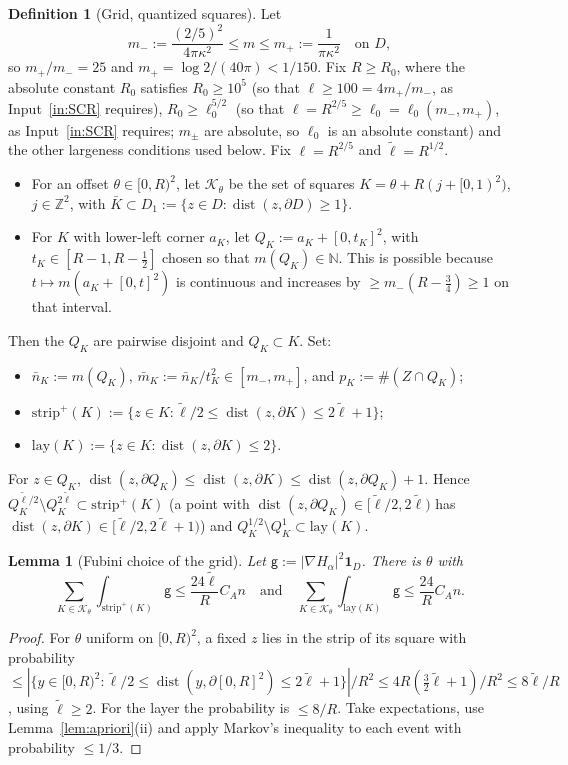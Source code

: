 \documentclass[11pt]{article}
\newtheorem{lemma}[theorem]{Lemma}
\theoremstyle{definition}
\newtheorem{definition}[theorem]{Definition}
\theoremstyle{remark}
\newcommand{\N}{\mathbb N}
\newcommand{\Z}{\mathbb Z}
\begin{document}
\begin{definition}[Grid, quantized squares]\label{def:grid}
Let
\[
m_-:=\frac{(2/5)^2}{4\pi\kappa^2}\le m\le m_+:=\frac1{\pi\kappa^2}\quad\text{on } D ,
\]
so $m_+/m_-=25$ and $m_+=\log2/(40\pi)<1/150$. Fix $R\ge R_0$, where the absolute constant $R_0$
satisfies $R_0\ge10^5$ (so that $\ell\ge100=4m_+/m_-$, as Input~\ref{in:SCR} requires),
$R_0\ge\ell_0^{5/2}$ (so that $\ell=R^{2/5}\ge\ell_0=\ell_0(m_-,m_+)$, as Input~\ref{in:SCR} requires;
$m_\pm$ are absolute, so $\ell_0$ is an absolute constant) and the other
largeness conditions used below. Fix $\ell=R^{2/5}$ and $\tilde\ell=R^{1/2}$.
\begin{itemize}[leftmargin=*]
\item For an offset $\theta\in[0,R)^2$, let $\mathcal K_\theta$ be the set of squares
  $K=\theta+R(j+[0,1)^2)$, $j\in\Z^2$, with $\bar K\subset D_1:=\{z\in D:\operatorname{dist}(z,\partial D)\ge1\}$.
\item For $K$ with lower-left corner $a_K$, let $Q_K:=a_K+[0,t_K]^2$, with $t_K\in[R-1,R-\tfrac12]$
  chosen so that $m(Q_K)\in\N$. This is possible because $t\mapsto m(a_K+[0,t]^2)$ is continuous
  and increases by $\ge m_-(R-\tfrac34)\ge1$ on that interval.
\end{itemize}
Then the $Q_K$ are pairwise disjoint and $Q_K\subset K$. Set:
\begin{itemize}[leftmargin=*]
\item $\bar n_K:=m(Q_K)$, $\bar m_K:=\bar n_K/t_K^2\in[m_-,m_+]$, and $p_K:=\#(Z\cap Q_K)$;
\item $\mathrm{strip}^+(K):=\{z\in K:\tilde\ell/2\le\operatorname{dist}(z,\partial K)\le2\tilde\ell+1\}$;
\item $\mathrm{lay}(K):=\{z\in K:\operatorname{dist}(z,\partial K)\le2\}$.
\end{itemize}
For $z\in Q_K$, $\operatorname{dist}(z,\partial Q_K)\le\operatorname{dist}(z,\partial K)\le\operatorname{dist}(z,\partial Q_K)+1$.
Hence $Q_K^{\tilde\ell/2}\setminus Q_K^{2\tilde\ell}\subset\mathrm{strip}^+(K)$ (a point with
$\operatorname{dist}(z,\partial Q_K)\in[\tilde\ell/2,2\tilde\ell)$ has $\operatorname{dist}(z,\partial K)\in[\tilde\ell/2,2\tilde\ell+1)$) and
$Q_K^{1/2}\setminus Q_K^1\subset\mathrm{lay}(K)$.
\end{definition}

\begin{lemma}[Fubini choice of the grid]\label{lem:fubini}
Let $\mathsf g:=|\nabla H_\alpha|^2\mathbf 1_D$. There is $\theta$ with
\[
\sum_{K\in\mathcal K_\theta}\int_{\mathrm{strip}^+(K)}\mathsf g\le\frac{24\tilde\ell}{R}C_An
\quad\text{and}\quad
\sum_{K\in\mathcal K_\theta}\int_{\mathrm{lay}(K)}\mathsf g\le\frac{24}{R}C_An .
\]
\end{lemma}
\begin{proof}
For $\theta$ uniform on $[0,R)^2$, a fixed $z$ lies in the strip of its square with probability
$\le|\{y\in[0,R)^2:\tilde\ell/2\le\operatorname{dist}(y,\partial[0,R]^2)\le2\tilde\ell+1\}|/R^2
\le4R(\tfrac32\tilde\ell+1)/R^2\le8\tilde\ell/R$, using $\tilde\ell\ge2$.
For the layer the probability is $\le8/R$. Take expectations, use Lemma~\ref{lem:apriori}(ii) and
apply Markov's inequality to each event with probability $\le1/3$.
\end{proof}
\end{document}
